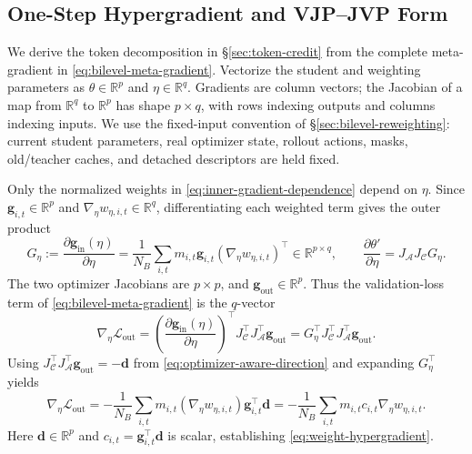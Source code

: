 \documentclass{article}
\theoremstyle{plain}
\theoremstyle{definition}
\theoremstyle{remark}
\newcommand{\R}{\mathbb{R}}
\begin{document}
\subsection{One-Step Hypergradient and VJP--JVP Form}
\label{app:bilevel-math}

We derive the token decomposition in \S\ref{sec:token-credit} from the complete meta-gradient in \cref{eq:bilevel-meta-gradient}. Vectorize the student and weighting parameters as \(\theta\in\R^p\) and \(\eta\in\R^q\). Gradients are column vectors; the Jacobian of a map from \(\R^q\) to \(\R^p\) has shape \(p\times q\), with rows indexing outputs and columns indexing inputs. We use the fixed-input convention of \S\ref{sec:bilevel-reweighting}: current student parameters, real optimizer state, rollout actions, masks, old/teacher caches, and detached descriptors are held fixed.

Only the normalized weights in \cref{eq:inner-gradient-dependence} depend on \(\eta\). Since \(\boldsymbol g_{i,t}\in\R^p\) and \(\nabla_\eta w_{\eta,i,t}\in\R^q\), differentiating each weighted term gives the outer product
\begin{equation}
    G_\eta:=\frac{\partial\boldsymbol g_{\mathrm{in}}(\eta)}{\partial\eta}
    =\frac{1}{N_B}\sum_{i,t}m_{i,t}
      \boldsymbol g_{i,t}\left(\nabla_\eta w_{\eta,i,t}\right)^\top
    \in\R^{p\times q},
    \qquad
    \frac{\partial\theta'}{\partial\eta}=J_{\mathcal A}J_{\mathcal C}G_\eta.
\label{eq:appendix-inner-jacobian}
\end{equation}
The two optimizer Jacobians are \(p\times p\), and \(\boldsymbol g_{\mathrm{out}}\in\R^p\). Thus the validation-loss term of \cref{eq:bilevel-meta-gradient} is the \(q\)-vector
\begin{equation}
    \nabla_\eta\mathcal L_{\mathrm{out}}
    =\left(\frac{\partial\boldsymbol g_{\mathrm{in}}(\eta)}{\partial\eta}\right)^\top
       J_{\mathcal C}^{\top}J_{\mathcal A}^{\top}\boldsymbol g_{\mathrm{out}}
    =G_\eta^\top J_{\mathcal C}^{\top}J_{\mathcal A}^{\top}\boldsymbol g_{\mathrm{out}}.
\label{eq:meta-chain-rule}
\end{equation}
Using \(J_{\mathcal C}^{\top}J_{\mathcal A}^{\top}\boldsymbol g_{\mathrm{out}}=-\boldsymbol d\) from \cref{eq:optimizer-aware-direction} and expanding \(G_\eta^\top\) yields
\begin{equation}
    \nabla_\eta\mathcal L_{\mathrm{out}}
    =-\frac{1}{N_B}\sum_{i,t}m_{i,t}
      \left(\nabla_\eta w_{\eta,i,t}\right)\boldsymbol g_{i,t}^{\top}\boldsymbol d
    =-\frac{1}{N_B}\sum_{i,t}m_{i,t}c_{i,t}\nabla_\eta w_{\eta,i,t}.
\label{eq:appendix-adamw-hypergradient}
\end{equation}
Here \(\boldsymbol d\in\R^p\) and \(c_{i,t}=\boldsymbol g_{i,t}^{\top}\boldsymbol d\) is scalar, establishing \cref{eq:weight-hypergradient}.
\end{document}
